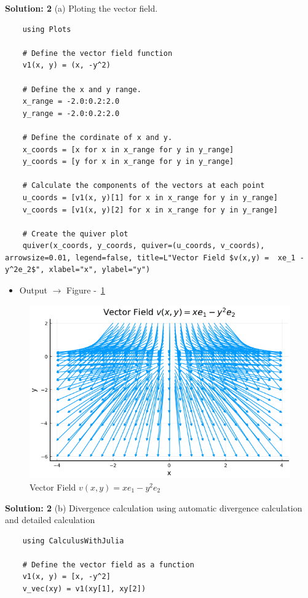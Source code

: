\documentclass{homework}
\begin{document}
\begin{solution}
    \textbf{Solution: 2}
    (a)  Ploting the vector field.
    \begin{verbatim}
    using Plots

    # Define the vector field function
    v1(x, y) = (x, -y^2)

    # Define the x and y range.
    x_range = -2.0:0.2:2.0
    y_range = -2.0:0.2:2.0

    # Define the cordinate of x and y.
    x_coords = [x for x in x_range for y in y_range]
    y_coords = [y for x in x_range for y in y_range]

    # Calculate the components of the vectors at each point
    u_coords = [v1(x, y)[1] for x in x_range for y in y_range]
    v_coords = [v1(x, y)[2] for x in x_range for y in y_range]

    # Create the quiver plot
    quiver(x_coords, y_coords, quiver=(u_coords, v_coords), arrowsize=0.01, legend=false, title=L"Vector Field $v(x,y) =  xe_1 -y^2e_2$", xlabel="x", ylabel="y")
    \end{verbatim}
    
    \begin{itemize}
        \item Output $\rightarrow$ Figure -~\ref{fig:vectorfield}
    \end{itemize}
    
    \begin{figure}[H]
        \centering
        \includegraphics[width=0.5\linewidth]{media/vectorfield.png}
        \caption{Vector Field $v(x,y) = xe_1 - y^2e_2$}
        \label{fig:vectorfield}
    \end{figure}
    
    \textbf{Solution: 2}
    (b)  Divergence calculation using  automatic divergence calculation and detailed calculation
    \begin{verbatim}
    using CalculusWithJulia

    # Define the vector field as a function
    v1(x, y) = [x, -y^2]
    v_vec(xy) = v1(xy[1], xy[2])


\end{verbatim}
\end{solution}
\end{document}
